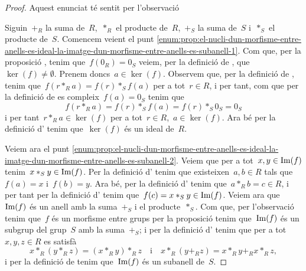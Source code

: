 \documentclass[../estructures-algebraiques.tex]{subfiles}
\begin{document}
    \begin{proof}
        Aquest enunciat té sentit per l'observació 

        Siguin~\(+_{R}\) la suma de~\(R\),~\(\ast_{R}\) el producte de~\(R\),~\(+_{S}\) la suma de~\(S\) i~\(\ast_{S}\) el producte de~\(S\).
        Comencem veient el punt \eqref{enum:prop:el-nucli-dun-morfisme-entre-anells-es-ideal-la-imatge-dun-morfisme-entre-anells-es-subanell-1}.
        Com que, per la proposició , tenim que~\(f(0_{R})=0_{S}\) veiem, per la definició de , que~\(\ker(f)\neq\emptyset\).
        Prenem doncs~\(a\in\ker(f)\).
        Observem que, per la definició de , tenim que~\(f(r\ast_{R}a)=f(r)\ast_{S}f(a)\) per a tot~\(r\in R\), i per tant, com que per la definició de  es compleix~\(f(a)=0_{S}\) tenim que \[f(r\ast_{R}a)=f(r)\ast_{S}f(a)=f(r)\ast_{S}0_{S}=0_{S}\]
        i per tant~\(r\ast_{R}a\in\ker(f)\) per a tot~\(r\in R\),~\(a\in\ker(f)\).
        Ara bé per la definició d' tenim que~\(\ker(f)\) és un ideal de~\(R\).

        Veiem ara el punt \eqref{enum:prop:el-nucli-dun-morfisme-entre-anells-es-ideal-la-imatge-dun-morfisme-entre-anells-es-subanell-2}.
        Veiem que per a tot~\(x,y\in\operatorname{Im}(f)\) tenim~\(x\ast_{S}y\in\operatorname{Im}(f)\).
        Per la definició d' tenim que existeixen~\(a,b\in R\) tals que~\(f(a)=x\) i~\(f(b)=y\).
        Ara bé, per la definició d' tenim que~\(a\ast_{R}b=c\in R\), i per tant per la definició d' tenim que~\(f(c)=x\ast_{S}y\in\operatorname{Im}(f)\).
        Veiem ara que~\(\operatorname{Im}(f)\) és un anell amb la suma~\(+_{S}\) i el producte~\(\ast_{S}\).
        Com que, per l'observació  tenim que~\(f\) és un morfisme entre grups per la proposició  tenim que~\(\operatorname{Im}(f)\) és un subgrup del grup~\(S\) amb la suma~\(+_{S}\); i per la definició d' tenim que per a tot~\(x,y,z\in R\) es satisfà
        \[
            x\ast_{R}(y\ast_{R}z)=(x\ast_{R}y)\ast_{R}z\quad\text{i}\quad x\ast_{R}(y+_{R}z)=x\ast_{R}y+_{R}x\ast_{R}z,
        \]
        i per la definició de  tenim que~\(\operatorname{Im}(f)\) és un subanell de~\(S\).
    \end{proof}
\end{document}

